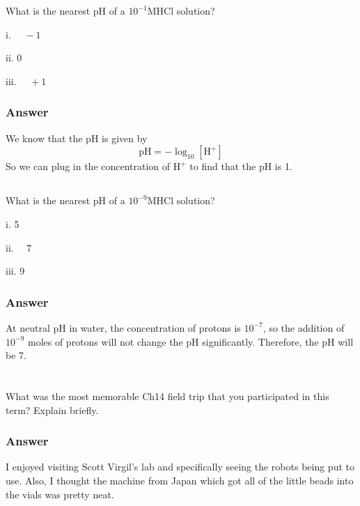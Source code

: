 \documentclass[12pt]{article}
\begin{document}
\section{}
\subsection{}
What is the nearest $\mathrm{pH}$ of a $10^{-1} \mathrm{M} \mathrm{HCl}$ solution?

i. $\quad-1$

ii. 0

iii. $\quad+1$
\subsubsection{Answer}
We know that the $\mathrm{pH}$ is given by
\begin{equation}
  \mathrm{pH} = -\log_{10}[\mathrm{H}^{+}]
\end{equation}
So we can plug in the concentration of $\mathrm{H}^{+}$ to find that the $\mathrm{pH}$ is 1.
\subsection{}

What is the nearest $\mathrm{pH}$ of a $10^{-9} \mathrm{M} \mathrm{HCl}$ solution?

i. 5

ii. $\quad 7$

iii. 9
\subsubsection{Answer}
At neutral pH in water, the concentration of protons is $10^{-7}$, so the addition of $10^{-9}$ moles of protons will not change the $\mathrm{pH}$ significantly. Therefore, the $\mathrm{pH}$ will be 7.

\section{}
\subsection{}
What was the most memorable Ch14 field trip that you participated in this term? Explain briefly.
\subsubsection{Answer}

I enjoyed visiting Scott Virgil's lab and specifically seeing the robots being put to use. Also, I thought the machine from Japan which got all of the little beads into the vials was pretty neat.
\end{document}
